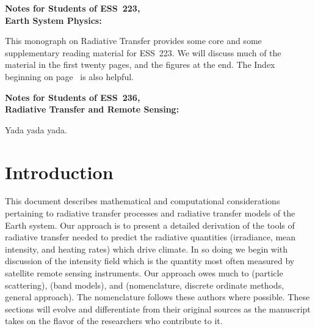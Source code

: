 \documentclass[12pt]{article}
\newcounter{idxpg} %
\begin{document}
\setcounter{page}{1}
\pagestyle{headings}
\thispagestyle{empty}

\clearpage
\begin{center}
\bigskip
{\Large \textbf{Notes for Students of ESS~223,\\ Earth System Physics:}}\\
\bigskip
\end{center}
This monograph on Radiative Transfer provides some core and some
supplementary reading material for ESS~223.
We will discuss much of the material in the first twenty pages,
and the figures at the end.
The Index beginning on page~\pageref{sxn:idx} is also helpful.
\begin{center}
\bigskip
{\Large \textbf{Notes for Students of ESS~236,\\ Radiative Transfer and Remote Sensing:}}\\
\bigskip
\end{center}
Yada yada yada.
\clearpage
\tableofcontents
\listoffigures
\listoftables
{}
\setcounter{page}{1}
\thispagestyle{empty}

\section{Introduction}\label{sxn:ntr}

This document describes mathematical and computational considerations 
pertaining to radiative transfer processes and radiative transfer
models of the Earth system. 
Our approach is to present a detailed derivation of the tools of
radiative transfer needed to predict the radiative quantities
(irradiance, mean intensity, and heating rates) which drive climate. 
In so doing we begin with discussion of the intensity field which is
the quantity most often measured by satellite remote sensing
instruments. 
Our approach owes much to \cite{BoH83} (particle scattering), 
\cite{GoY89} (band models), and \cite{ThS99} (nomenclature,
discrete ordinate methods, general approach).
The nomenclature follows these authors where possible.
These sections will evolve and differentiate from their original 
sources as the manuscript takes on the flavor of the researchers who
contribute to it. 
\end{document}
